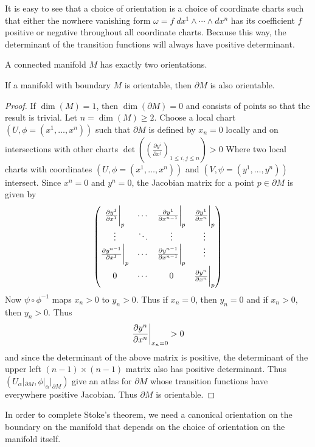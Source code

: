 \documentclass[a4paper]{article}
\begin{document}
It is easy to see that a choice of orientation is a choice of coordinate charts such that either the nowhere vanishing form $\omega=f\;dx^1\wedge\cdots\wedge dx^n$ has its coefficient $f$ positive or negative throughout all coordinate charts. Because this way, the determinant of the transition functions will always have positive determinant. 

\begin{prp}{}{} A connected manifold $M$ has exactly two orientations. 
\end{prp}

\begin{prp}{}{} If a manifold with boundary $M$ is orientable, then $\partial M$ is also orientable. 
\begin{proof}
If $\dim(M)=1$, then $\dim(\partial M)=0$ and consists of points so that the result is trivial. Let $n=\dim(M)\geq 2$. Choose a local chart $(U,\phi=(x^1,\dots,x^n))$ such that $\partial M$ is defined by $x_n=0$ locally and on intersections with other charts $\det\left(\left(\frac{\partial y^i}{\partial x^j}\right)_{1\leq i,j\leq n}\right)>0$ Where two local charts with coordinates $(U,\phi=(x^1,\dots,x^n))$ and $(V,\psi=(y^1,\dots,y^n))$ intersect. Since $x^n=0$ and $y^n=0$, the Jacobian matrix for a point $p\in\partial M$ is given by $$\begin{pmatrix}
\frac{\partial y^1}{\partial x^1}\bigg{|}_p & \cdots & \frac{\partial y^1}{\partial x^{n-1}}\bigg{|}_p & \frac{\partial y^1}{\partial x^n}\bigg{|}_p\\
\vdots & \ddots & \vdots & \vdots\\
\frac{\partial y^{n-1}}{\partial x^1}\bigg{|}_p & \cdots & \frac{\partial y^{n-1}}{\partial x^{n-1}}\bigg{|}_p & \vdots\\
0 & \cdots & 0 & \frac{\partial y^n}{\partial x^n}\bigg{|}_p
\end{pmatrix}$$
Now $\psi\circ\phi^{-1}$ maps $x_n>0$ to $y_n>0$. Thus if $x_n=0$, then $y_n=0$ and if $x_n>0$, then $y_n>0$. Thus $$\frac{\partial y^n}{\partial x^n}\bigg{|}_{x_n=0}>0$$ and since the determinant of the above matrix is positive, the determinant of the upper left $(n-1)\times(n-1)$ matrix also has positive determinant. Thus $(U_\alpha|_{\partial M},\phi|_{\alpha}|_{\partial M})$ give an atlas for $\partial M$ whose transition functions have everywhere positive Jacobian. Thus $\partial M$ is orientable. 
\end{proof}
\end{prp}

In order to complete Stoke's theorem, we need a canonical orientation on the boundary on the manifold that depends on the choice of orientation on the manifold itself. 
\end{document}
